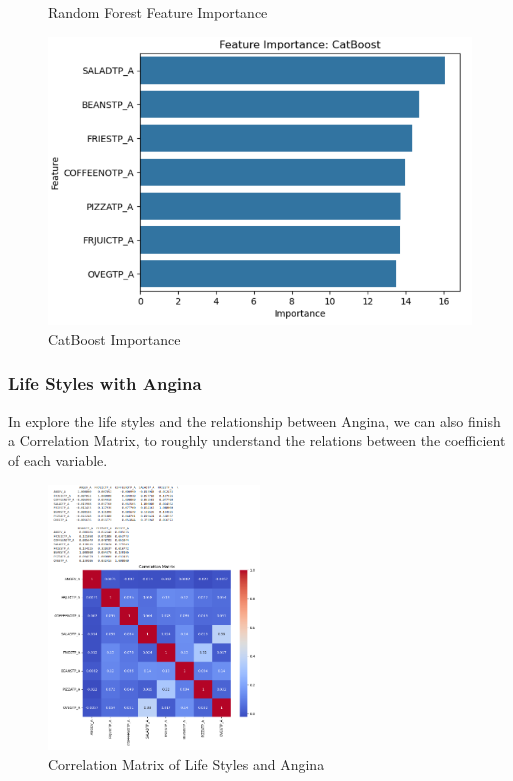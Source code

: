 \documentclass{article}
\begin{document}
\begin{figure}[h!]
\begin{minipage}{0.32\textwidth}
		\caption{Random Forest Feature Importance}
		\label{fig:P14}
	\end{minipage}\hfill
	\begin{minipage}{0.32\textwidth}
		\centering
		\includegraphics[width=0.9\linewidth]{../Image/P15.jpg}
		\caption{CatBoost Importance}
		\label{fig:P15}
	\end{minipage}
\end{figure}

\subsubsection{Life Styles with Angina}

In explore the life styles and the relationship between Angina, we can also finish a Correlation Matrix, to roughly understand the relations between the coefficient of each variable.

\begin{figure}[!h]
	\centering
	\includegraphics[width=0.5\textwidth]{../Image/P5.jpg}
	\caption{Correlation Matrix of Life Styles and Angina}
	\label{fig:P5}
\end{figure}
\end{document}
